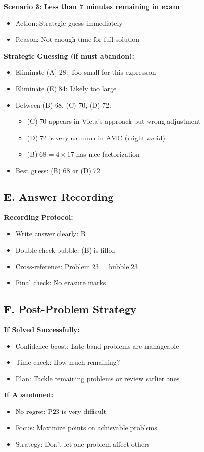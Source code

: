 \documentclass[12pt]{article}
\begin{document}
\begin{competitionbox}
\textbf{Scenario 3: Less than 7 minutes remaining in exam}
\begin{itemize}
    \item Action: Strategic guess immediately
    \item Reason: Not enough time for full solution
\end{itemize}

\textbf{Strategic Guessing (if must abandon):}
\begin{itemize}
    \item Eliminate (A) 28: Too small for this expression
    \item Eliminate (E) 84: Likely too large
    \item Between (B) 68, (C) 70, (D) 72:
    \begin{itemize}
        \item (C) 70 appears in Vieta's approach but wrong adjustment
        \item (D) 72 is very common in AMC (might avoid)
        \item (B) 68 = $4 \times 17$ has nice factorization
    \end{itemize}
    \item Best guess: (B) 68 or (D) 72
\end{itemize}

\subsection*{E. Answer Recording}

\textbf{Recording Protocol:}
\begin{itemize}
    \item Write answer clearly: B
    \item Double-check bubble: (B) is filled
    \item Cross-reference: Problem 23 = bubble 23
    \item Final check: No erasure marks
\end{itemize}

\subsection*{F. Post-Problem Strategy}

\textbf{If Solved Successfully:}
\begin{itemize}
    \item Confidence boost: Late-band problems are manageable
    \item Time check: How much remaining?
    \item Plan: Tackle remaining problems or review earlier ones
\end{itemize}

\textbf{If Abandoned:}
\begin{itemize}
    \item No regret: P23 is very difficult
    \item Focus: Maximize points on achievable problems
    \item Strategy: Don't let one problem affect others
\end{itemize}

\end{competitionbox}
\end{document}
